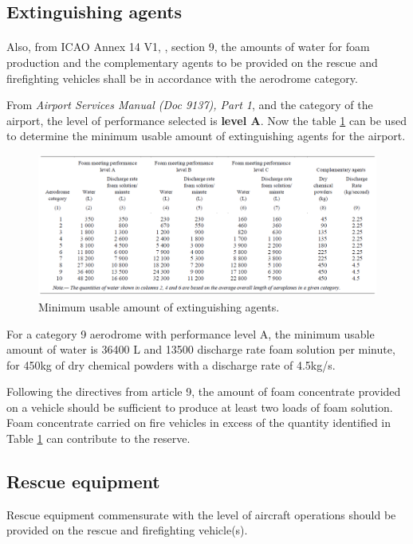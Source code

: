 		\subsection{Extinguishing agents}
		\paragraph{} Also, from ICAO Annex 14 V1, \cite{Standards2016}, section 9, the amounts of water for foam production and the complementary agents to be provided on the rescue and firefighting vehicles shall be in accordance with the aerodrome category.
		
		From \textit{Airport Services Manual (Doc 9137), Part 1}, \cite{InternationalCivilAviationOrganisation2014} and the category of the airport, the level of performance selected is \textbf{level A}. Now the table \ref{table92} can be used to determine the minimum usable amount of extinguishing agents for the airport.  
		\begin{figure}[H]
			\centering
			\includegraphics[clip, trim=0cm 0cm 0cm 0cm, width=1\textwidth]{./images/firefighting/table92}
			\caption{Minimum usable amount of extinguishing agents.}
			\label{table92}
		\end{figure}
	
	For a category 9 aerodrome with performance level A, the minimum usable amount of water is 36400 L and 13500 discharge rate foam solution per minute, for 450kg of dry chemical powders with a discharge rate of 4.5kg/s.

	Following the directives from article 9, the amount of foam concentrate provided on a vehicle should be sufficient to produce at least two loads of foam solution. Foam concentrate carried on fire vehicles in excess of the quantity identified in Table \ref{table92} can contribute to the reserve.
	
		\subsection{Rescue equipment}
Rescue equipment commensurate with the level of aircraft operations should be provided on the rescue and firefighting vehicle(s).
